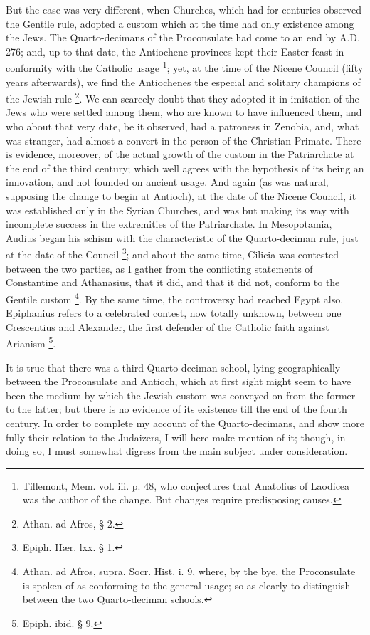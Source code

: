 But the case was very different, when Churches, which had for
centuries observed the Gentile rule, adopted a custom which at the
time had only existence among the Jews. The Quarto-decimans of the
Proconsulate had come to an end by A.D. 276;
and, up to that date, the Antiochene provinces kept their Easter feast
in conformity with the Catholic usage \footnote{Tillemont, Mem. vol. iii. p. 48, who
conjectures that Anatolius of Laodicea was the author of the change.
But changes require predisposing causes.}; yet, at the time of the Nicene Council (fifty years
afterwards), we find the Antiochenes the especial and solitary
champions of the Jewish rule \footnote{Athan. ad Afros, § 2.}. We can scarcely doubt that they adopted it in imitation of
the Jews who were settled among them, who are known to have influenced
them, and who about that very date, be it observed, had a patroness in
Zenobia, and, what was stranger, had almost a convert in the person of
the Christian Primate. There is evidence, moreover, of the actual
growth of the custom in the Patriarchate at the end of the third
century; which well agrees with the hypothesis of its being an
innovation, and not founded on ancient usage. And again (as was
natural, supposing the change to begin at Antioch), at the date of the
Nicene Council, it was established only in the Syrian Churches, and
was but making its way with incomplete success in the extremities of
the Patriarchate. In Mesopotamia, Audius began his schism with the
characteristic of the Quarto-deciman rule, just at the date of the
Council \footnote{Epiph. Hær. lxx. § 1.}; and about the
same time, Cilicia was contested between the two parties, as I gather
from the conflicting statements of Constantine and Athanasius, that it
did, and that it did not, conform to the Gentile custom \footnote{Athan. ad Afros, supra. Socr. Hist. i. 9,
where, by the bye, the Proconsulate is spoken of as conforming to the
general usage; so as clearly to distinguish between the two Quarto-deciman
schools.}. By the same time, the controversy had reached Egypt also.
Epiphanius refers to a celebrated contest, now totally unknown,
between one Crescentius and Alexander, the first defender of the
Catholic faith against Arianism \footnote{Epiph. ibid. § 9.}.

It is true that there was a third Quarto-deciman school, lying
geographically between the Proconsulate and Antioch, which at first
sight might seem to have been the medium by which the Jewish custom
was conveyed on from the former to the latter; but there is no
evidence of its existence till the end of the fourth century. In order
to complete my account of the Quarto-decimans, and show more fully
their relation to the Judaizers, I will here make mention of it;
though, in doing so, I must somewhat digress from the main subject
under consideration.


